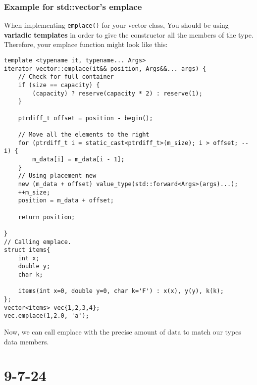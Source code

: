 \documentclass{report}
\begin{document}
\subsubsection*{Example for std::vector's emplace}
When implementing \texttt{emplace()} for your vector class, You should be using \textbf{variadic templates} in order to give the constructor all the members of the type. Therefore, your emplace function might look like this:
\begin{verbatim}
template <typename it, typename... Args>
iterator vector::emplace(it&& position, Args&&... args) {
    // Check for full container
    if (size == capacity) {
        (capacity) ? reserve(capacity * 2) : reserve(1);
    }
    
    ptrdiff_t offset = position - begin();

    // Move all the elements to the right
    for (ptrdiff_t i = static_cast<ptrdiff_t>(m_size); i > offset; --i) {
        m_data[i] = m_data[i - 1];
    }
    // Using placement new
    new (m_data + offset) value_type(std::forward<Args>(args)...);
    ++m_size;
    position = m_data + offset;

    return position;

}
// Calling emplace.
struct items{
    int x;
    double y;
    char k;

    items(int x=0, double y=0, char k='F') : x(x), y(y), k(k);
};
vector<items> vec{1,2,3,4};
vec.emplace(1,2.0, 'a');
\end{verbatim}
Now, we can call emplace with the precise amount of data to match our types data members.
\section{9-7-24}
\end{document}
